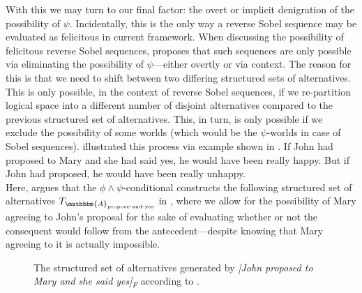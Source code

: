 With this we may turn to our final factor: the overt or implicit denigration of the possibility of $\psi$. Incidentally, this is the only way a reverse Sobel sequence may be evaluated as felicitous in  current framework. When discussing the possibility of felicitous reverse Sobel sequences, \textcite[p.~663]{Ippolito2020} proposes that such sequences are only possible via eliminating the possibility of $\psi$---either overtly or via context. The reason for this is that we need to shift between two differing structured sets of alternatives. This is only possible, in the context of reverse Sobel sequences, if we re-partition logical space into a different number of disjoint alternatives compared to the previous structured set of alternatives. This, in turn, is only possible if we exclude the possibility of some worlds (which would be the $\psi$-worlds in case of Sobel sequences). \textcite{Ippolito2020} illustrated this process via  example shown in .
\pex{}
\a{} If John had proposed to Mary and she had said yes, he would have been really happy.
\a{} But if John had proposed, he would have been really unhappy.\\\emptyfill\parencite[p. 577]{Moss2012}
\xe
Here, \textcite{Ippolito2020} argues that the $\phi\land\psi$-conditional constructs the following structured set of alternatives $T_{\mathbbm{A}_\text{propose-and-yes}}$ in , where we allow for the possibility of Mary agreeing to John's proposal for the sake of evaluating whether or not the consequent would follow from the antecedent---despite knowing that Mary agreeing to it is actually impossible.
\begin{figure}[!htb]
    \centering
    
    \caption{The structured set of alternatives generated by \textit{[John proposed to Mary and she said yes]\textsubscript{F}} according to \textcite{Ippolito2020}.}
\end{figure}

